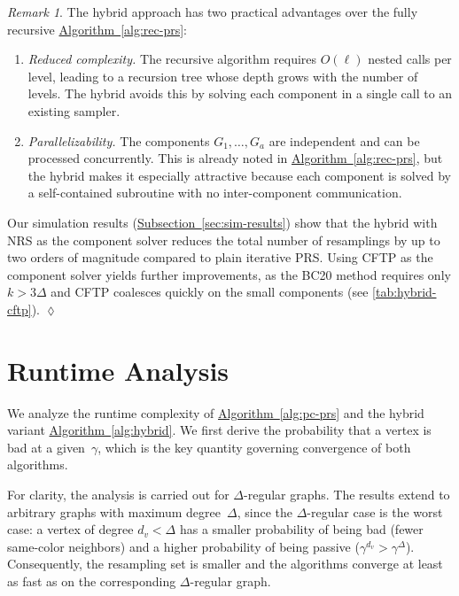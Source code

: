 \documentclass[12pt, a4paper]{article}
\theoremstyle{plain}
\theoremstyle{definition}
\theoremstyle{remark}
\newtheorem{remark}{Remark}
\newcommand{\sref}[2]{\hyperref[#2]{#1~\ref*{#2}}}
\begin{document}
\begin{remark}\normalfont
The hybrid approach has two practical advantages over the fully recursive \sref{Algorithm}{alg:rec-prs}:
\begin{enumerate}
\item {\em Reduced complexity.} The recursive algorithm requires \(O(\ell)\) nested calls per level, leading to a recursion tree whose depth grows with the number of levels. The hybrid avoids this by solving each component in a single call to an existing sampler.
\item {\em Parallelizability.} The components \(G_1,\ldots,G_a\) are independent and can be processed concurrently. This is already noted in \sref{Algorithm}{alg:rec-prs}, but the hybrid makes it especially attractive because each component is solved by a self-contained subroutine with no inter-component communication.
\end{enumerate}
Our simulation results (\sref{Subsection}{sec:sim-results}) show that the hybrid with NRS as the component solver reduces the total number of resamplings by up to two orders of magnitude compared to plain iterative PRS. Using CFTP as the component solver yields further improvements, as the BC20 method \cite{BC20} requires only \(k>3\Delta\) and CFTP coalesces quickly on the small components (see \autoref{tab:hybrid-cftp}).
\hfill\(\lozenge\)
\end{remark}

\section{Runtime Analysis}\label{sec:runtime}

We analyze the runtime complexity of \sref{Algorithm}{alg:pc-prs} and the hybrid variant \sref{Algorithm}{alg:hybrid}. We first derive the probability that a vertex is bad at a given~\(\gamma\), which is the key quantity governing convergence of both algorithms.

For clarity, the analysis is carried out for \(\Delta\)-regular graphs. The results extend to arbitrary graphs with maximum degree~\(\Delta\), since the \(\Delta\)-regular case is the worst case: a vertex of degree \(d_v < \Delta\) has a smaller probability of being bad (fewer same-color neighbors) and a higher probability of being passive (\(\gamma^{d_v} > \gamma^{\Delta}\)). Consequently, the resampling set is smaller and the algorithms converge at least as fast as on the corresponding \(\Delta\)-regular graph.
\end{document}
